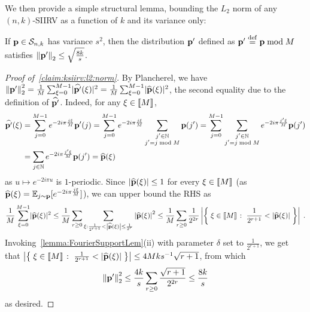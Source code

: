 We then provide a simple structural lemma, bounding the $L_2$ norm of any $(n,k)$-SIIRV as a function of $k$ and its variance only:
\begin{lemma}\label{claim:ksiirv:l2:norm}
  If $\mathbf{p} \in \mathcal{S}_{n, k}$ has variance $s^2$, then the distribution $\mathbf{p}'$ defined as $\mathbf{p}' \stackrel{\rm def}{=} \mathbf{p} \bmod M$ satisfies 
  $
      {\lVert\mathbf{p}'{\rVert}}_2 \leq \sqrt{\frac{8k}{s}}
  $.
\end{lemma}
\begin{proof}[Proof of~\cref{claim:ksiirv:l2:norm}]
By Plancherel, we have
$
  {\lVert\mathbf{p}'{\rVert}}_2^2 = \frac{1}{M} \sum_{\xi=0}^{M-1} \lvert \widehat{\mathbf{p}'}(\xi) \rvert^2 = \frac{1}{M} \sum_{\xi=0}^{M-1} \lvert \widehat{\mathbf{p}}(\xi) \rvert^2
$, 
the second equality due to the definition of $\widehat{\mathbf{p}'}$. Indeed, for any $\xi\in\llbracket M\rrbracket$, 
\begin{align*}
    \widehat{\mathbf{p}'}(\xi) &= \sum_{j=0}^{M-1} e^{-2i\pi \frac{j\xi}{M}} \mathbf{p}'(j) = \sum_{j=0}^{M-1} e^{-2i\pi \frac{j\xi}{M}} \sum_{\substack{j'\in\mathbb{N}\\j' = j \bmod M}} \mathbf{p}(j')
    = \sum_{j=0}^{M-1} \sum_{\substack{j'\in\mathbb{N}\\j' = j \bmod M}} e^{-2i\pi \frac{j'\xi}{M}} \mathbf{p}(j')
    \\
    &= \sum_{j\in\mathbb{N}} e^{-2i\pi \frac{j'\xi}{M}} \mathbf{p}(j')
    = \widehat{\mathbf{p}}(\xi)
\end{align*}
as $u\mapsto e^{-2i\pi u}$ is $1$-periodic. Since $\left\lvert \widehat{\mathbf{p}}(\xi) \right\rvert\leq 1$ for every $\xi\in\llbracket M\rrbracket$ (as $\widehat{\mathbf{p}}(\xi) = \mathbb{E}_{j\sim \mathbf{p}}[e^{-2i\pi \frac{j\xi}{M}}]$), we can upper bound the RHS as
\[
    \frac{1}{M} \sum_{\xi=0}^{M-1} \lvert \widehat{\mathbf{p}}(\xi) \rvert^2 \leq \frac{1}{M} \sum_{r\geq 0} \sum_{\xi : \frac{1}{2^{r+1}} < \left\lvert \widehat{\mathbf{p}}(\xi) \right\rvert \leq \frac{1}{2^{r}}} \left\lvert \widehat{\mathbf{p}}(\xi) \right\rvert^2
    \leq \frac{1}{M} \sum_{r\geq 0} \frac{1}{2^{2r}} \left\lvert \left\{\;  \xi\in\llbracket M\rrbracket  \;\colon\;  \frac{1}{2^{r+1}} < \left\lvert \widehat{\mathbf{p}}(\xi) \right\rvert \; \right\} \right\rvert\;.
\]
Invoking~\cref{lemma:FourierSupportLem}(ii) with parameter $\delta$ set to $\frac{1}{2^{r+1}}$, we get that $\left\lvert \left\{\;  \xi\in\llbracket M\rrbracket  \;\colon\;  \frac{1}{2^{r+1}} < \left\lvert \widehat{\mathbf{p}}(\xi) \right\rvert \; \right\} \right\rvert \leq 4Mk s^{-1} \sqrt{r+1}$, from which \[
    {\lVert\mathbf{p}'{\rVert}}_2^2 \leq \frac{4k}{s} \sum_{r\geq 0} \frac{\sqrt{r+1}}{2^{2r}} \leq \frac{8k}{s}
\]
as desired.
\end{proof}

